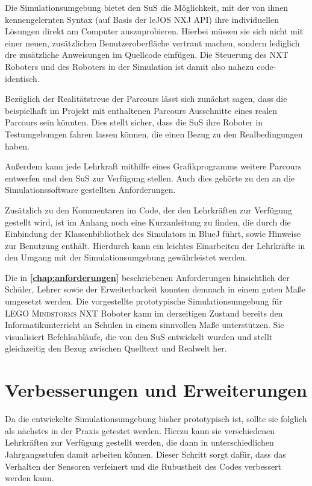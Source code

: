 \documentclass[paper=a4, DIV=calc, BCOR=12mm, twoside=on, onecolumn=on, open = right, titlepage =on, parskip =half-, headsepline = on, footsepline = off, chapterprefix = off, appendixprefix = on, fontsize = 12pt, numbers = noenddot, abstract = on]{scrbook}
\begin{document}
Die Simulationsumgebung bietet den SuS die Möglichkeit, mit der von ihnen kennengelernten Syntax (auf Basis der leJOS NXJ API) ihre individuellen Lösungen direkt am Computer auszuprobieren. Hierbei müssen sie sich nicht mit einer neuen, zusätzlichen Benutzeroberfläche vertraut machen, sondern lediglich dre zusätzliche Anweisungen im Quellcode einfügen. Die Steuerung des NXT Roboters und des Roboters in der Simulation ist damit also nahezu code-identisch.

Bezüglich der Realitätstreue der Parcours lässt sich zunächst sagen, dass die beispielhaft im Projekt mit enthaltenen Parcours Ausschnitte eines realen Parcours sein könnten. Dies stellt sicher, dass die SuS ihre Roboter in Testumgebungen fahren lassen können, die einen Bezug zu den Realbedingungen haben.

Außerdem kann jede Lehrkraft mithilfe eines Grafikprogramms weitere Parcours entwerfen und den SuS zur Verfügung stellen. Auch dies gehörte zu den an die Simulationssoftware gestellten Anforderungen.

Zusätzlich zu den Kommentaren im Code, der den Lehrkräften zur Verfügung gestellt wird, ist im Anhang noch eine Kurzanleitung zu finden, die durch die Einbindung der Klassenbibliothek des Simulators in BlueJ führt, sowie Hinweise zur Benutzung enthält. Hierdurch kann ein leichtes Einarbeiten der Lehrkräfte in den Umgang mit der Simulationsumgebung gewährleistet werden. 

Die in \textbf{\ref{chap:anforderungen}} beschriebenen Anforderungen hinsichtlich der Schüler, Lehrer sowie der Erweiterbarkeit konnten demnach in einem guten Maße umgesetzt werden. Die vorgestellte prototypische Simulationsumgebung für \textsc{LEGO Mindstorms} NXT Roboter kann im derzeitigen Zustand bereits den Informatikunterricht an Schulen in einem sinnvollen Maße unterstützen. Sie visualisiert Befehlsabläufe, die von den SuS entwickelt wurden und stellt gleichzeitig den Bezug zwischen Quelltext und Realwelt her. 

\section{Verbesserungen und Erweiterungen}

Da die entwickelte Simulationsumgebung bisher prototypisch ist, sollte sie folglich als nächstes in der Praxis getestet werden. Hierzu kann sie verschiedenen Lehrkräften zur Verfügung gestellt werden, die dann in unterschiedlichen Jahrgangsstufen damit arbeiten können. Dieser Schritt sorgt dafür, dass das Verhalten der Sensoren verfeinert und die Rubustheit des Codes verbessert werden kann.
\end{document}

